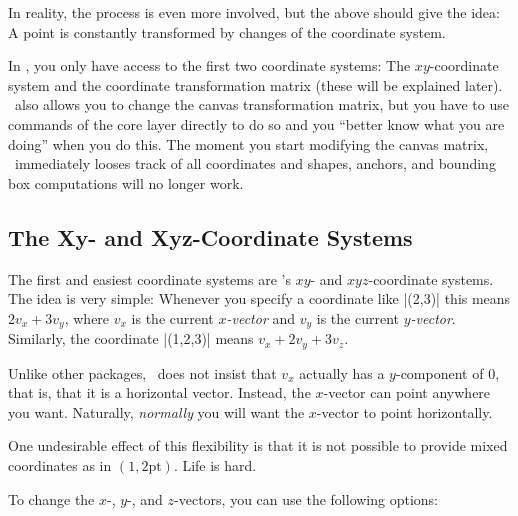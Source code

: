 In reality, the process is even more involved, but the above should
give the idea: A point is constantly transformed by changes of the
coordinate system.

In \tikzname, you only have access to the first two coordinate systems:
The $xy$-coordinate system and the coordinate transformation matrix
(these will be explained later). \pgfname\ also allows you to change
the canvas transformation matrix, but you have to use commands of
the core layer directly to do so and you ``better know what you are
doing'' when you do this. The moment you start modifying the
canvas matrix, \pgfname\ immediately looses track of all
coordinates and shapes, anchors, and bounding box computations will no
longer work.


\subsection{The Xy- and Xyz-Coordinate Systems}

The first and easiest coordinate systems are \pgfname's $xy$- and
$xyz$-coordinate systems. The idea is very simple: Whenever you
specify a coordinate like |(2,3)| this means $2v_x + 3v_y$, where
$v_x$ is the current \emph{$x$-vector} and $v_y$ is the current
\emph{$y$-vector}. Similarly, the coordinate |(1,2,3)| means $v_x +
2v_y + 3v_z$.

Unlike other packages, \pgfname\ does not insist that $v_x$ actually
has a $y$-component of $0$, that is, that it is a horizontal
vector. Instead, the $x$-vector can point anywhere you
want. Naturally, \emph{normally} you will want the $x$-vector to point
horizontally.

One undesirable effect of this flexibility is that it is not possible
to provide mixed coordinates as in $(1,2\mathrm{pt})$. Life is hard.

To change the $x$-, $y$-, and $z$-vectors, you can use the following
options:

